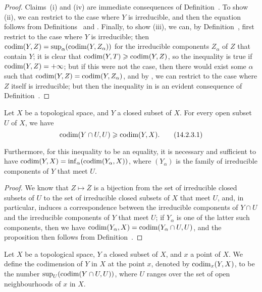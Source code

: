 \begin{proof}
Claims~(i) and (iv) are immediate consequences of Definition~.
To show (ii), we can restrict to the case where $Y$ is irreducible, and then the equation follows from Definitions~ and .
Finally, to show (iii), we can, by Definition~, first restrict to the case where $Y$ is irreducible;
then $\operatorname{codim}(Y,Z)=\sup_\alpha(\operatorname{codim}(Y,Z_\alpha))$ for the irreducible components $Z_\alpha$ of $Z$ that contain $Y$;
it is clear that $\operatorname{codim}(Y,T)\geqslant\operatorname{codim}(Y,Z)$, so the inequality is true if $\operatorname{codim}(Y,Z)=+\infty$;
but if this were not the case, then there would exist some $\alpha$ such that $\operatorname{codim}(Y,Z)=\operatorname{codim}(Y,Z_\alpha)$, and by , we can restrict to the case where $Z$ itself is irreducible;
but then the inequality in  is an evident consequence of Definition~.
\end{proof}

\begin{proposition}[14.2.3]
\label{0.14.2.3}
Let $X$ be a topological space, and $Y$ a closed subset of $X$.
For every open subset $U$ of $X$, we have
\[
\label{0.14.2.3.1}
  \operatorname{codim}(Y\cap U,U)\geqslant\operatorname{codim}(Y,X).
  \tag{14.2.3.1}
\]

Furthermore, for this inequality  to be an equality, it is necessary and sufficient to have $\operatorname{codim}(Y,X)=\inf_\alpha(\operatorname{codim}(Y_\alpha,X))$, where $(Y_\alpha)$ is the family of irreducible components of $Y$ that meet $U$.
\end{proposition}

\begin{proof}
We know  that $Z\mapsto\overline{Z}$ is a bijection from the set of irreducible closed subsets of $U$ to the set of irreducible closed subsets of $X$ that meet $U$, and, in particular, induces a correspondence between the irreducible components of $Y\cap U$ and the irreducible components of $Y$ that meet $U$;
if $Y_\alpha$ is one of the latter such components, then we have $\operatorname{codim}(Y_\alpha,X)=\operatorname{codim}(Y_\alpha\cap U,U)$, and the proposition then follows from Definition~.
\end{proof}

\begin{definition}[14.2.4]
\label{0.14.2.4}
Let $X$ be a topological space, $Y$ a closed subset of $X$, and $x$ a point of $X$.
We define the codimension of $Y$ in $X$ at the point $x$, denoted by $\operatorname{codim}_x(Y,X)$, to be the number $\sup_U(\operatorname{codim}(Y\cap U,U))$, where $U$ ranges over the set of open neighbourhoods of $x$ in $X$.
\end{definition}

